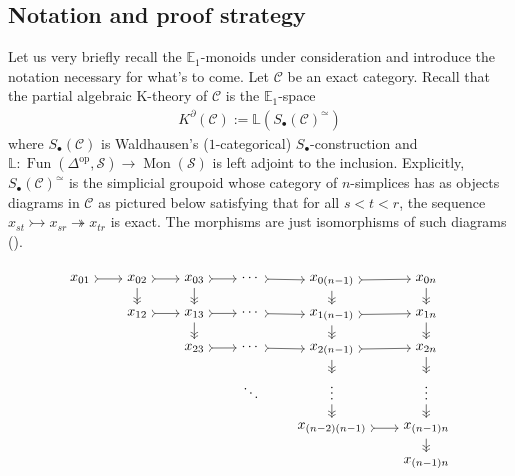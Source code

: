 \documentclass[12pt, reqno]{amsart}
\theoremstyle{plain}
\theoremstyle{definition}
\begin{document}
\subsection{Notation and proof strategy}\label{monoids in question}

Let us very briefly recall the $\mathbb{E}_1$-monoids under consideration and introduce the notation necessary for what's to come. Let $\mathcal{C}$ be an exact category. Recall that the partial algebraic K-theory of $\mathcal{C}$ is the $\mathbb{E}_1$-space
\begin{align*}
K^\partial(\mathcal{C}):=\mathbb{L}(S_\bullet(\mathcal{C})^{\simeq})
\end{align*}
where $S_\bullet(\mathcal{C})$ is Waldhausen's ($1$-categorical) $S_\bullet$-construction and $\mathbb{L}\colon \operatorname{Fun}(\Delta^{\operatorname{op}},\mathcal{S})\rightarrow \operatorname{Mon}(\mathcal{S})$ is left adjoint to the inclusion. Explicitly, $S_\bullet(\mathcal{C})^{\simeq}$ is the simplicial groupoid whose category of $n$-simplices has as objects diagrams in $\mathcal{C}$ as pictured below satisfying that for all $s<t<r$, the sequence $x_{st}\rightarrowtail x_{sr}\twoheadrightarrow x_{tr}$ is exact. The morphisms are just isomorphisms of such diagrams (\cite{Waldhausen}).

\begin{center}
\begin{equation}\label{element in Sdot}
\begin{tikzpicture}[baseline=(current  bounding  box.center)]
\matrix (m) [matrix of math nodes,row sep=1em,column sep=2em]
{
x_{01}  & x_{02} & x_{03} & \cdots\vphantom{_*} & x_{0(n-1)} & x_{0n} \\
		& x_{12} & x_{13} & \cdots\vphantom{_*} & x_{1(n-1)} & x_{1n} \\
		&		 & x_{23} & \cdots\vphantom{_*} & x_{2(n-1)} & x_{2n} \\
& & & \ddots & \vdots & \vdots \\
& & & & x_{(n-2)(n-1)} & x_{(n-1)n} \\
& & & & & x_{(n-1)n} \\
};
\path[>->]
(m-1-1) edge (m-1-2)
(m-1-2) edge (m-1-3)
(m-1-3) edge (m-1-4)
(m-1-4) edge (m-1-5)
(m-1-5) edge (m-1-6)
(m-2-2) edge (m-2-3)
(m-2-3) edge (m-2-4)
(m-2-4) edge (m-2-5)
(m-2-5) edge (m-2-6)
(m-3-3) edge (m-3-4)
(m-3-4) edge (m-3-5)
(m-3-5) edge (m-3-6)
(m-5-5) edge (m-5-6)
;
\path[->>]
(m-1-2) edge (m-2-2)
(m-1-3) edge (m-2-3)
(m-1-5) edge (m-2-5)
(m-1-6) edge (m-2-6)
(m-2-3) edge (m-3-3)
(m-2-5) edge (m-3-5)
(m-2-6) edge (m-3-6)
(m-3-5) edge (m-4-5)
(m-3-6) edge (m-4-6)
(m-4-5) edge (m-5-5)
(m-4-6) edge (m-5-6)
(m-5-6) edge (m-6-6)
;
\end{tikzpicture}
\end{equation}
\end{center}
\end{document}
